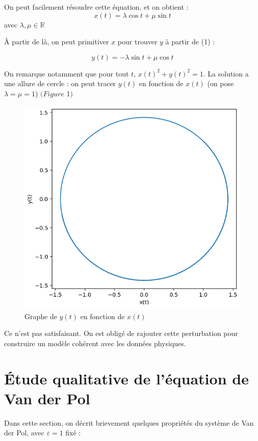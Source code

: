 \documentclass{article}
\begin{document}
On peut facilement résoudre cette équation, et on obtient :
\[ x(t) = \lambda \cos t + \mu \sin t\]
avec $\lambda ,\mu \in \mathbb{R}$

À partir de là, on peut primitiver $x$ pour trouver $y$ à partir de (1) :

\[ y(t) = -\lambda \sin t + \mu \cos t\]

On remarque notamment que pour tout $t$,  $x(t)^2 + y(t)^2 = 1$. La solution a une allure de cercle : on peut tracer $y(t)$ en fonction de $x(t)$ (on pose $\lambda = \mu = 1$)  $(Figure$ 1$)$ 

\begin{figure}[!h]
\centering
\includegraphics[scale=0.5]{../images/plot_circ.png}
\caption{Graphe de $y(t)$ en fonction de $x(t)$}
\end{figure}

Ce n'est pas satisfaisant. On est obligé de rajouter cette perturbation pour construire un modèle cohérent avec les données physiques.

\section{Étude qualitative de l’équation de Van der Pol}


Dans cette section, on décrit brievement quelques propriétés du système de Van der Pol, avec $\varepsilon = 1$ fixé :
\end{document}

